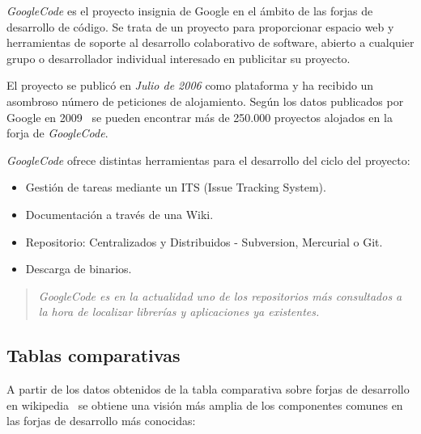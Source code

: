 \par \emph{GoogleCode} es el proyecto insignia de Google en el ámbito de las forjas de desarrollo de código. Se trata de un proyecto para proporcionar espacio web y herramientas de soporte al desarrollo colaborativo de software, abierto a cualquier grupo o desarrollador individual interesado en publicitar su proyecto.

\par El proyecto se publicó en \emph{Julio de 2006} como plataforma y ha recibido un asombroso número de peticiones de alojamiento. Según los datos publicados por Google en 2009~\cite{google-code-open} se pueden encontrar más de 250.000 proyectos alojados en la forja de \emph{GoogleCode}.

\par \emph{GoogleCode} ofrece distintas herramientas para el desarrollo del ciclo del proyecto:

\begin{itemize}
	\item Gestión de tareas mediante un ITS (Issue Tracking System).
	\item Documentación a través de una Wiki.
	\item Repositorio: Centralizados y Distribuidos - Subversion, Mercurial o Git.
	\item Descarga de binarios.
\end{itemize}

\begin{quote}
    \emph{GoogleCode es en la actualidad uno de los repositorios más consultados a la hora de localizar librerías y aplicaciones ya existentes.}
\end{quote}


\subsection{Tablas comparativas}
\label{sub:comparativa-forjas}

\par A partir de los datos obtenidos de la tabla comparativa sobre forjas de desarrollo en wikipedia~ \cite{comparativa-forjas-wiki} se obtiene una visión más amplia de los componentes comunes en las forjas de desarrollo más conocidas:


